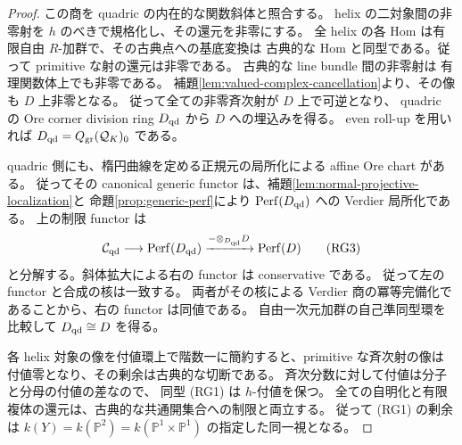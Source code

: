 \begin{proof}
この商を quadric の内在的な関数斜体と照合する。
helix の二対象間の非零射を $h$ のべきで規格化し、その還元を非零にする。
全 helix の各 Hom は有限自由 $R$-加群で、その古典点への基底変換は
古典的な Hom と同型である。従って primitive な射の還元は非零である。
古典的な line bundle 間の非零射は
有理関数体上でも非零である。
補題\ref{lem:valued-complex-cancellation}より、その像も $D$ 上非零となる。
従って全ての非零斉次射が $D$ 上で可逆となり、
quadric の Ore corner division ring $D_{\rm qd}$ から $D$ への埋込みを得る。
even roll-up を用いれば $D_{\rm qd}=Q_{\rm gr}(\mathcal Q_K)_0$ である。

quadric 側にも、楕円曲線を定める正規元の局所化による affine Ore chart がある。
従ってその canonical generic functor は、補題\ref{lem:normal-projective-localization}と
命題\ref{prop:generic-perf}により $\operatorname{Perf}(D_{\rm qd})$ への Verdier 局所化である。
上の制限 functor は
\[
 \mathcal C_{\rm qd}\longrightarrow\operatorname{Perf}(D_{\rm qd})
 \xrightarrow{-\otimes_{D_{\rm qd}}D}\operatorname{Perf}(D)
 \tag{RG3}
\]
と分解する。斜体拡大による右の functor は conservative である。
従って左の functor と合成の核は一致する。
両者がその核による Verdier 商の冪等完備化であることから、右の functor は同値である。
自由一次元加群の自己準同型環を比較して $D_{\rm qd}\cong D$ を得る。

各 helix 対象の像を付値環上で階数一に簡約すると、primitive な斉次射の像は
付値零となり、その剰余は古典的な切断である。
斉次分数に対して付値は分子と分母の付値の差なので、
同型 (RG1) は $h$-付値を保つ。
全ての自明化と有限複体の還元は、古典的な共通開集合への制限と両立する。
従って (RG1) の剰余は $k(Y)=k(\mathbb P^2)=k(\mathbb P^1\times\mathbb P^1)$
の指定した同一視となる。
\end{proof}


